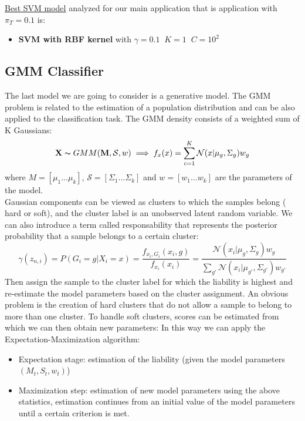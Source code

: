 \documentclass{article}
\begin{document}
\underline{Best SVM model} analyzed for our main application that is application with \(\pi_T=0.1\) is:
\begin{itemize}
    \item \textbf{SVM with RBF kernel } with \(\gamma=0.1\;\; K=1\;\; C=10^2\)
\end{itemize}

\subsection{GMM Classifier}
The last model we are going to consider is a generative model. The GMM problem is related to the
estimation of a population distribution and can be also applied to the classification task.
The GMM density consists of a weighted sum of K Gaussians:
\begin{equation}
\mathbf{X}\thicksim  GMM(\mathbf{M} ,\mathcal{S},w)\implies f_x(x)=\sum_{c=1}^{K}\mathcal{N}(x|\mu_g,\Sigma_g)w_g
\end{equation}
where \( M=[\mu_1...\mu_k]\), \(\mathcal{S}=[\Sigma_1...\Sigma_k]\) and \(w=[w_1...w_k]\) are the parameters of the model.\\
Gaussian components can be viewed as clusters to which the samples belong ( hard or soft), and the cluster label is an unobserved latent random variable. We can also introduce a term called responsability that represents the posterior probability that a sample belongs to a certain cluster:
\begin{equation}
    \gamma(z_{n,i})=P(G_i=g| X_i=x)=\frac{f_{x_i,G_i}(x_i,g)}{f_{x_i}(x_i)}=\frac{\mathcal{N}(x_i|\mu_g,\Sigma_g)w_g}{\sum_{g'}\mathcal{N}(x_i|\mu_{g'},\Sigma_{g'})w_{g'}}
\end{equation}
Then assign the sample to the cluster label for which the liability is highest and re-estimate the model parameters based on the cluster assignment. An obvious problem is the creation of hard clusters that do not allow a sample to belong to more than one cluster. To handle soft clusters, scores can be estimated from which we can then obtain new parameters:
In this way we can apply the Expectation-Maximization algorithm:
\begin{itemize}
    \item Expectation stage: estimation of the liability (given the model parameters \((M_t,S_t,w_t)\))
    \item Maximization step: estimation of new model parameters using the above statistics, estimation continues from an initial value of the model parameters until a certain criterion is met. 
\end{itemize}
\end{document}
